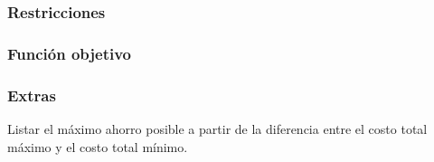 \documentclass{article}
\begin{document}
\subsubsection{Restricciones}


\subsubsection{Función objetivo}

\subsubsection{Extras}
Listar el máximo ahorro posible a partir de la diferencia entre el costo total máximo y el costo total mínimo.
\end{document}
